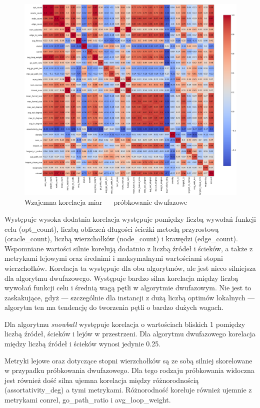 \begin{figure}[h!]
    \centering
    \includegraphics[width=\textwidth]{chapters/experiments/img/twophase_corr.png}
    \caption{Wzajemna korelacja miar --- próbkowanie dwufazowe}
    \label{fig:corr_twophase}
\end{figure}

Występuje wysoka dodatnia korelacja występuje pomiędzy liczbą wywołań funkcji celu (opt\_count),
liczbą obliczeń długości ścieżki metodą przyrostową (oracle\_count), liczbą wierzchołków (node\_count) i krawędzi (edge\_count).
Wspomniane wartości silnie korelują dodatnio z liczbą źródeł i ścieków, a także z metrykami lejowymi oraz średnimi i maksymalnymi wartościami stopni wierzchołków.
Korelacja ta występuje dla obu algorytmów, ale jest nieco silniejsza dla algorytmu dwufazowego.
Występuje bardzo silna korelacja między liczbą wywołań funkcji celu i średnią wagą pętli w algorytmie dwufazowym.
Nie jest to zaskakujące, gdyż --- szczególnie dla instancji z dużą liczbą optimów lokalnych --- algorytm ten ma tendencję do tworzenia pętli o bardzo dużych wagach.

Dla algorytmu \textit{snowball} występuje korelacja o wartościach bliskich 1 pomiędzy liczbą źródeł, ścieków i lejów w przestrzeni.
Dla algorytmu dwufazowego korelacja między liczbą źródeł i ścieków wynosi jedynie 0.25.

Metryki lejowe oraz dotyczące stopni wierzchołków są ze sobą silniej skorelowane w przypadku próbkowania dwufazowego.
Dla tego rodzaju próbkowania widoczna jest również dość silna ujemna korelacja między różnorodnością (assortativity\_deg) a tymi metrykami.
Różnorodność koreluje również ujemnie z metrykami conrel, go\_path\_ratio i avg\_loop\_weight.

